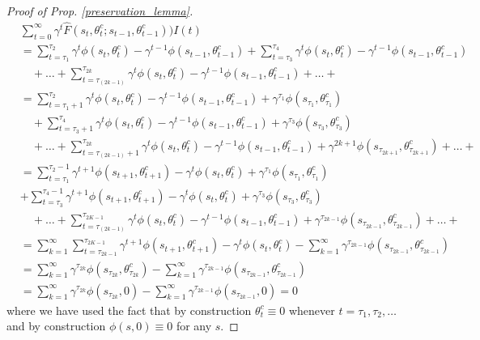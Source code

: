 \documentclass{article}
\begin{document}
\begin{proof}[Proof of Prop. \ref{preservation_lemma}]
\begin{align*}
&\sum_{t=0}^\infty\gamma^{t}\hat{F}(s_t,\theta^c_t;s_{t-1},\theta^c_{t-1}))I(t)
\\&=\sum_{t=\tau_1}^{\tau_2}\gamma^{t}\phi(s_t,\theta^c_t)-\gamma^{t-1}\phi(s_{t-1},\theta^c_{t-1}) +\sum_{t=\tau_3}^{\tau_4}\gamma^{t}\phi(s_t,\theta^c_t)-\gamma^{t-1}\phi(s_{t-1},\theta^c_{t-1})
\\&\quad+\ldots+ \sum_{t=\tau_{(2k-1)}}^{\tau_{2k
}}\gamma^{t}\phi(s_t,\theta^c_t)-\gamma^{t-1}\phi(s_{t-1},\theta^c_{t-1})+\ldots+
% 
% 
% 
\\&=\sum_{t=\tau_1+1}^{\tau_2}\gamma^{t}\phi(s_t,\theta^c_t)-\gamma^{t-1}\phi(s_{t-1},\theta^c_{t-1})+\gamma^{\tau_1}\phi(s_{\tau_1},\theta^c_{\tau_1})
\\&\quad +\sum_{t=\tau_3+1}^{\tau_4}\gamma^{t}\phi(s_t,\theta^c_t)-\gamma^{t-1}\phi(s_{t-1},\theta^c_{t-1})+\gamma^{\tau_3}\phi(s_{\tau_3},\theta^c_{\tau_3})
\\&\quad+\ldots+ \sum_{t=\tau_{(2k-1)}+1}^{\tau_{2k
}}\gamma^{t}\phi(s_t,\theta^c_t)-\gamma^{t-1}\phi(s_{t-1},\theta^c_{t-1})+\gamma^{2k+1}\phi(s_{\tau_{2k+1}},\theta^c_{\tau_{2k+1}})+\ldots+
% 
% 
% 
\\&=\sum_{t=\tau_1}^{\tau_2-1}\gamma^{t+1}\phi(s_{t+1},\theta^c_{t+1})-\gamma^{t}\phi(s_t,\theta^c_{t})+\gamma^{\tau_1}\phi(s_{\tau_1},\theta^c_{\tau_1})
\\&+\sum_{t=\tau_3}^{\tau_4-1}\gamma^{t+1}\phi(s_{t+1},\theta^c_{t+1})-\gamma^{t}\phi(s_t,\theta^c_{t})+\gamma^{\tau_3}\phi(s_{\tau_3},\theta^c_{\tau_3})
\\&\quad+\ldots+ \sum_{t=\tau_{(2k-1)}}^{\tau_{2K-1}}\gamma^{t}\phi(s_t,\theta^c_t)-\gamma^{t-1}\phi(s_{t-1},\theta^c_{t-1})+\gamma^{\tau_{2k-1}}\phi(s_{\tau_{2k-1}},\theta^c_{\tau_{2k-1}})+\ldots+
% 
% 
% 
\\&=\sum_{k=1}^\infty\sum_{t=\tau_{2k-1}}^{\tau_{2K-1}}\gamma^{t+1}\phi(s_{t+1},\theta^c_{t+1})-\gamma^{t}\phi(s_t,\theta^c_{t})-\sum_{k=1}^\infty\gamma^{\tau_{2k-1}}\phi(s_{\tau_{2k-1}},\theta^c_{\tau_{2k-1}})
\\&=\sum_{k=1}^\infty\gamma^{\tau_{2k}}\phi(s_{\tau_{2k}},\theta^c_{\tau_{2k}})-\sum_{k=1}^\infty\gamma^{\tau_{2k-1}}\phi(s_{\tau_{2k-1}},\theta^c_{\tau_{2k-1}})
\\&=\sum_{k=1}^\infty\gamma^{\tau_{2k}}\phi(s_{\tau_{2k}},0)-\sum_{k=1}^\infty\gamma^{\tau_{2k-1}}\phi(s_{\tau_{2k-1}},0)=0
\end{align*}
where we have used the fact that by construction  $\theta^c_t\equiv 0$ whenever $t=\tau_1,\tau_2,\ldots$ and by construction $\phi(s,0)\equiv 0$ for any $s$. 


\end{proof}
\end{document}
